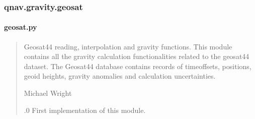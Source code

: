 \documentclass[letterpaper,10pt,english]{sphinxmanual}
\begin{document}
\sphinxstepscope


\subsubsection{qnav.gravity.geosat}
\label{\detokenize{modules/gravity/geosat:module-qnav.gravity.geosat}}\label{\detokenize{modules/gravity/geosat:qnav-gravity-geosat}}\label{\detokenize{modules/gravity/geosat::doc}}

\paragraph{geosat.py}
\label{\detokenize{modules/gravity/geosat:geosat-py}}\begin{quote}\begin{description}
\sphinxAtStartPar
Geosat\sphinxhyphen{}44 reading, interpolation and gravity functions.
This module contains all the gravity calculation functionalities related
to the geosat\sphinxhyphen{}44 dataset. The Geosat44 database contains records of
time\sphinxhyphen{}offsets, positions, geoid heights, gravity anomalies and
calculation uncertainties.

\sphinxAtStartPar
Michael Wright \sphinxhyphen{} 

.0 \sphinxhyphen{} First implementation of this module.

\end{description}\end{quote}
\end{document}
